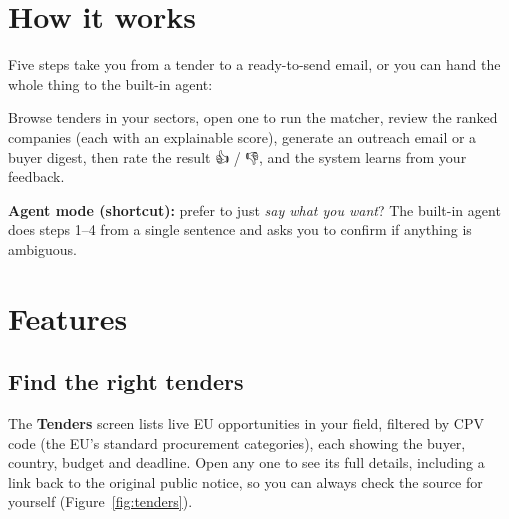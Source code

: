 \section{How it works}\label{how-it-works}

Five steps take you from a tender to a ready-to-send email, or you can hand the whole
thing to the built-in agent:

\begin{center}
\end{center}

Browse tenders in your sectors, open one to run the matcher, review the ranked
companies (each with an explainable score), generate an outreach email or a buyer
digest, then rate the result 👍 / 👎, and the system learns from your feedback.

\textbf{Agent mode (shortcut):} prefer to just \emph{say what you want}? The built-in
agent does steps 1--4 from a single sentence and asks you to confirm if anything is
ambiguous.

\section{Features}\label{features}

\subsection{Find the right tenders}\label{tender-discovery}

The \textbf{Tenders} screen lists live EU opportunities in your field, filtered by
CPV code (the EU's standard procurement categories), each showing the buyer,
country, budget and deadline. Open any one to see its full
details, including a link back to the original public notice, so you can always
check the source for yourself (Figure~\ref{fig:tenders}).

